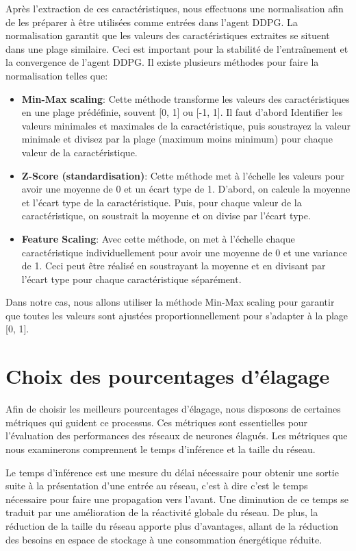 Après l'extraction de ces caractéristiques, nous effectuons une normalisation afin de les préparer à être utilisées comme entrées dans l'agent DDPG. La normalisation garantit que les valeurs des caractéristiques extraites se situent dans une plage similaire. Ceci est important pour la stabilité de l'entraînement et la convergence de l’agent DDPG. Il existe plusieurs méthodes pour faire la normalisation telles que:
\begin{itemize}
    \item \textbf{Min-Max scaling}: Cette méthode transforme les valeurs des caractéristiques en une plage prédéfinie, souvent [0, 1] ou [-1, 1]. Il faut d'abord Identifier les valeurs minimales et maximales de la caractéristique, puis soustrayez la valeur minimale et divisez par la plage (maximum moins minimum) pour chaque valeur de la caractéristique.
    \item \textbf{Z-Score (standardisation)}: Cette méthode met à l'échelle les valeurs pour avoir une moyenne de 0 et un écart type de 1. D'abord, on calcule la moyenne et l’écart type de la caractéristique. Puis, pour chaque valeur de la caractéristique, on soustrait la moyenne et on divise par l'écart type.
    \item \textbf{Feature Scaling}: Avec cette méthode, on met à l'échelle chaque caractéristique individuellement pour avoir une moyenne de 0 et une variance de 1. Ceci peut être réalisé en soustrayant la moyenne et en divisant par l'écart type pour chaque caractéristique séparément.
\end{itemize}

Dans notre cas, nous allons utiliser la méthode Min-Max scaling pour garantir que toutes les valeurs sont ajustées proportionnellement pour s'adapter à la plage [0, 1].

\section{Choix des pourcentages d'élagage}
Afin de choisir les meilleurs pourcentages d'élagage, nous disposons de certaines métriques qui guident ce processus. Ces métriques sont essentielles pour l'évaluation des performances des réseaux de neurones élagués. Les métriques que nous examinerons comprennent le temps d'inférence et la taille du réseau.

Le temps d'inférence est une mesure du délai nécessaire pour obtenir une sortie suite à la présentation d'une entrée au réseau, c'est à dire c'est le temps nécessaire pour faire une propagation vers l'avant. Une diminution de ce temps se traduit par une amélioration de la réactivité globale du réseau. De plus, la réduction de la taille du réseau apporte plus d'avantages, allant de la réduction des besoins en espace de stockage à une consommation énergétique réduite.

